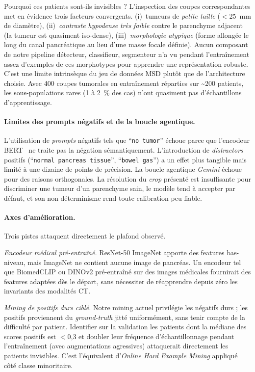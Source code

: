 \documentclass{article}
\begin{document}
Pourquoi ces patients sont-ils invisibles ? L'inspection des coupes
correspondantes met en \'evidence trois facteurs convergents. (i)~tumeurs de
\emph{petite taille} ($<$25~mm de diam\`etre), (ii)~\emph{contraste
hypodense tr\`es faible} contre le parenchyme adjacent (la tumeur est
quasiment iso-dense), (iii)~\emph{morphologie atypique} (forme allong\'ee
le long du canal pancr\'eatique au lieu d'une masse focale d\'efinie). Aucun
composant de notre pipeline d\'etecteur, classifieur, segmenteur n'a
vu pendant l'entra\^inement assez d'exemples de ces morphotypes pour
apprendre une repr\'esentation robuste. C'est une limite intrins\`eque du jeu
de donn\'ees MSD plut\^ot que de l'architecture choisie. Avec 400 coupes
tumorales en entra\^inement r\'eparties sur \textasciitilde 200 patients, les
sous-populations rares (1 \`a 2~\% des cas) n'ont quasiment pas
d'\'echantillons d'apprentissage.

\paragraph{Limites des prompts n\'egatifs et de la boucle agentique.}
L'utilisation de \emph{prompts} n\'egatifs tels que ``\texttt{no~tumor}''
\'echoue parce que l'encodeur BERT~\cite{devlin2019bert} ne traite pas la
n\'egation s\'emantiquement. L'introduction de \emph{distractors} positifs
(``\texttt{normal pancreas tissue}'', ``\texttt{bowel gas}'') a un effet
plus tangible mais limit\'e \`a une dizaine de points de pr\'ecision. La
boucle agentique \emph{Gemini} \'echoue pour des raisons orthogonales. La
r\'esolution du \emph{crop} pr\'esent\'e est insuffisante pour discriminer
une tumeur d'un parenchyme sain, le mod\`ele tend \`a accepter par d\'efaut,
et son non-d\'eterminisme rend toute calibration peu fiable.

\paragraph{Axes d'am\'elioration.}
Trois pistes attaquent directement le plafond observ\'e.

\emph{Encodeur m\'edical pr\'e-entra\^in\'e.} ResNet-50 ImageNet apporte des
features bas-niveau, mais ImageNet ne contient aucune image de pancr\'eas.
Un encodeur tel que BiomedCLIP ou DINOv2 pr\'e-entra\^in\'e sur des images
m\'edicales fournirait des features adapt\'ees d\`es le d\'epart, sans
n\'ecessiter de r\'eapprendre depuis z\'ero les invariants des
modalit\'es CT.

\emph{Mining de positifs durs cibl\'e.} Notre mining actuel privil\'egie les
n\'egatifs durs ; les positifs proviennent du \emph{ground-truth} jitt\'e
uniform\'ement, sans tenir compte de la difficult\'e par patient. Identifier
sur la validation les patients dont la m\'ediane des scores positifs est
$<$0{,}3 et doubler leur fr\'equence d'\'echantillonnage pendant
l'entra\^inement (avec augmentations agressives) attaquerait directement les
patients invisibles. C'est l'\'equivalent d'\emph{Online Hard Example Mining}
appliqu\'e c\^ot\'e classe minoritaire.
\end{document}
